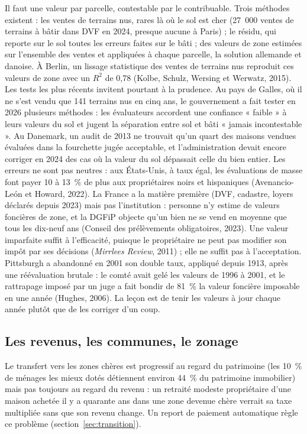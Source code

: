 \documentclass[11pt,a4paper]{article}
\begin{document}
Il faut une valeur par parcelle, contestable par le contribuable. Trois méthodes existent : les ventes de terrains nus, rares là où le sol est cher (27~000 ventes de
terrains à bâtir dans DVF en 2024, presque aucune à Paris) ; le résidu, qui reporte sur le sol
toutes les erreurs faites sur le bâti ; des valeurs de zone estimées sur l'ensemble des ventes et
appliquées à chaque parcelle, la solution allemande et danoise. À Berlin, un lissage
statistique des ventes de terrains nus reproduit ces valeurs de zone avec un $R^2$ de 0,78 (Kolbe,
Schulz, Wersing et Werwatz, 2015). Les tests les plus récents invitent pourtant à la prudence. Au
pays de Galles, où il ne s'est vendu que 141 terrains nus en cinq ans, le gouvernement a fait
tester en 2026 plusieurs méthodes : les évaluateurs accordent une confiance « faible » à leurs
valeurs du sol et jugent la séparation entre sol et bâti « jamais incontestable ». Au Danemark, un
audit de 2013 ne trouvait qu'un quart des maisons vendues évaluées dans la fourchette jugée
acceptable, et l'administration devait encore corriger en 2024 des cas où la valeur du sol
dépassait celle du bien entier. Les erreurs ne sont pas neutres : aux États-Unis, à taux égal, les
évaluations de masse font payer 10 à 13~\% de plus aux propriétaires noirs et hispaniques
(Avenancio-León et Howard, 2022). La France a la matière première
(DVF, cadastre, loyers déclarés depuis 2023) mais pas l'institution : personne n'y estime de
valeurs foncières de zone, et la DGFiP objecte qu'un bien ne se vend en moyenne que tous les
dix-neuf ans (Conseil des prélèvements obligatoires, 2023). Une valeur imparfaite suffit à l'efficacité, puisque le propriétaire ne
peut pas modifier son impôt par ses décisions (\emph{Mirrlees Review}, 2011) ; elle ne suffit pas à
l'acceptation. Pittsburgh a abandonné en 2001 son double taux, appliqué depuis 1913, après une
réévaluation brutale : le comté avait gelé les valeurs de 1996 à 2001, et le rattrapage imposé par
un juge a fait bondir de 81~\% la valeur foncière imposable en une année (Hughes, 2006). La leçon
est de tenir les valeurs à jour chaque année plutôt que de les corriger d'un coup.

\subsection{Les revenus, les communes, le zonage}

Le transfert vers les zones chères est progressif au regard du patrimoine (les 10~\% de ménages les
mieux dotés détiennent environ 44~\% du patrimoine immobilier) mais pas toujours au regard du
revenu : un retraité modeste propriétaire d'une maison achetée il y a quarante ans dans une zone
devenue chère verrait sa taxe multipliée sans que son revenu change. Un report de paiement automatique règle ce problème
(section~\ref{sec:transition}).
\end{document}
